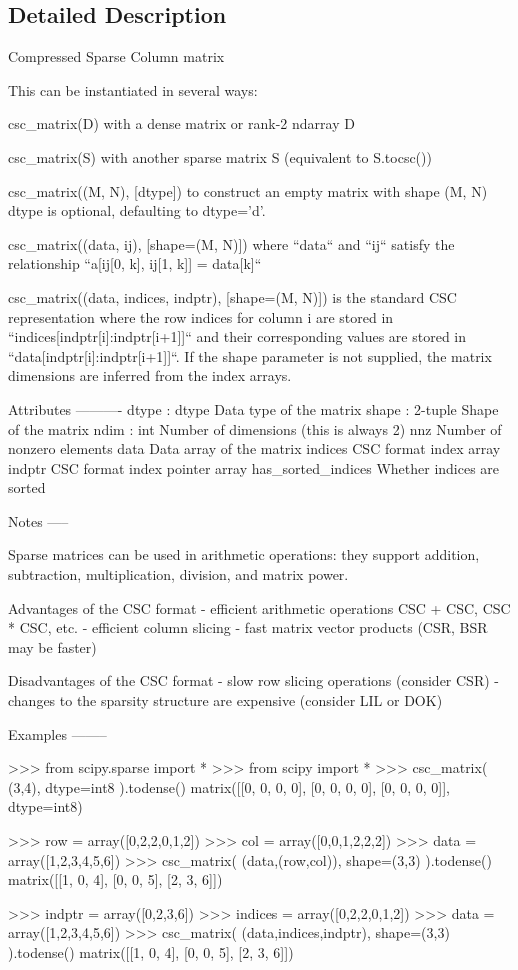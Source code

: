\subsection{Detailed Description}
\begin{DoxyVerb}Compressed Sparse Column matrix

This can be instantiated in several ways:

    csc_matrix(D)
        with a dense matrix or rank-2 ndarray D

    csc_matrix(S)
        with another sparse matrix S (equivalent to S.tocsc())

    csc_matrix((M, N), [dtype])
        to construct an empty matrix with shape (M, N)
        dtype is optional, defaulting to dtype='d'.

    csc_matrix((data, ij), [shape=(M, N)])
        where ``data`` and ``ij`` satisfy the relationship
        ``a[ij[0, k], ij[1, k]] = data[k]``

    csc_matrix((data, indices, indptr), [shape=(M, N)])
        is the standard CSC representation where the row indices for
        column i are stored in ``indices[indptr[i]:indptr[i+1]]``
        and their corresponding values are stored in
        ``data[indptr[i]:indptr[i+1]]``.  If the shape parameter is
        not supplied, the matrix dimensions are inferred from
        the index arrays.

Attributes
----------
dtype : dtype
    Data type of the matrix
shape : 2-tuple
    Shape of the matrix
ndim : int
    Number of dimensions (this is always 2)
nnz
    Number of nonzero elements
data
    Data array of the matrix
indices
    CSC format index array
indptr
    CSC format index pointer array
has_sorted_indices
    Whether indices are sorted

Notes
-----

Sparse matrices can be used in arithmetic operations: they support
addition, subtraction, multiplication, division, and matrix power.

Advantages of the CSC format
    - efficient arithmetic operations CSC + CSC, CSC * CSC, etc.
    - efficient column slicing
    - fast matrix vector products (CSR, BSR may be faster)

Disadvantages of the CSC format
  - slow row slicing operations (consider CSR)
  - changes to the sparsity structure are expensive (consider LIL or DOK)


Examples
--------

>>> from scipy.sparse import *
>>> from scipy import *
>>> csc_matrix( (3,4), dtype=int8 ).todense()
matrix([[0, 0, 0, 0],
        [0, 0, 0, 0],
        [0, 0, 0, 0]], dtype=int8)

>>> row = array([0,2,2,0,1,2])
>>> col = array([0,0,1,2,2,2])
>>> data = array([1,2,3,4,5,6])
>>> csc_matrix( (data,(row,col)), shape=(3,3) ).todense()
matrix([[1, 0, 4],
        [0, 0, 5],
        [2, 3, 6]])

>>> indptr = array([0,2,3,6])
>>> indices = array([0,2,2,0,1,2])
>>> data = array([1,2,3,4,5,6])
>>> csc_matrix( (data,indices,indptr), shape=(3,3) ).todense()
matrix([[1, 0, 4],
        [0, 0, 5],
        [2, 3, 6]])\end{DoxyVerb}
 

